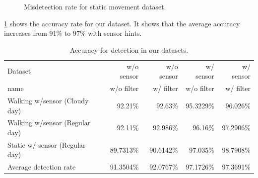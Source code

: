 \begin{figure}[!ht]
\centering
{}

\caption{Misdetection rate for static movement dataset.}
\label{f:fp_stat}
\end{figure}

\ref{t:acc_stat} shows the accuracy rate for our  dataset.
It shows that the average accuracy increases from 91\% to 97\% with sensor hints.

\begin{table}[h!]
  \centering
  \caption{Accuracy for detection in our datasets.}
  \label{t:acc_stat}
  \begin{tabular}{  l  r  r r r }
    \rowcolor{gray!50}
    Dataset & w/o sensor & w/o sensor & w/ sensor & w/ sensor \\
    \rowcolor{gray!50}
    name & w/o filter & w/ filter & w/o filter & w/ filter \\
    \hline
    Walking w/sensor (Cloudy day) & 92.21\% & 92.63\% & 95.3229\% & 96.026\% \\
    Walking w/sensor (Regular day) & 92.11\% & 92.986\% & 96.16\% & 97.2906\% \\
    Static w/ sensor (Regular day) & 89.7313\% & 90.6142\% & 97.035\% & 98.7908\% \\
    \hline
    Average detection rate & 91.3504\% & 92.0767\% & 97.1726\% & 97.3691\%\\
  \end{tabular}
\end{table}

